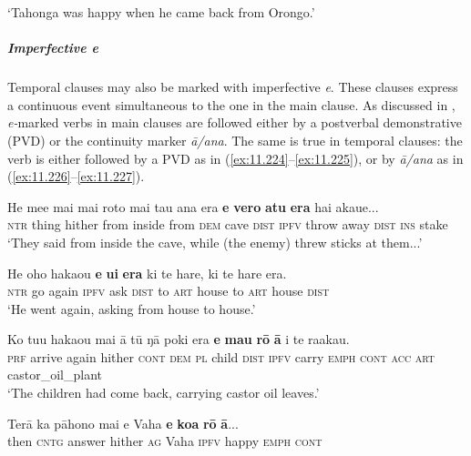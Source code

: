 \glt 
‘Tahonga was happy when he came back from Orongo.’ \textstyleExampleref{[R301.316]} 
\z

\subparagraph{Imperfective \textit{e}} Temporal clauses may also be marked with imperfective \textit{e}. These clauses express a continuous event simultaneous to the one in the main clause. As discussed in , \textit{e-}marked verbs in main clauses are followed either by a postverbal demonstrative (PVD) or the continuity marker \textit{{\ꞌ}ā/{\ꞌ}ana}. The same is true in temporal clauses: the verb is either followed by a PVD as in (\ref{ex:11.224}–\ref{ex:11.225}), or by \textit{{\ꞌ}ā/{\ꞌ}ana} as in (\ref{ex:11.226}–\ref{ex:11.227}).

\ea\label{ex:11.224}
\gll He me{\ꞌ}e mai mai roto mai tau {\ꞌ}ana era \textbf{e} \textbf{vero} \textbf{atu} \textbf{era} hai akaue... \\
\textsc{ntr} thing hither from inside from \textsc{dem} cave \textsc{dist} \textsc{ipfv} throw away \textsc{dist} \textsc{ins} stake \\

\glt 
‘They said from inside the cave, while (the enemy) threw sticks at them...’ \textstyleExampleref{[Mtx-3-02.042]}
\z

\ea\label{ex:11.225}
\gll He oho haka{\ꞌ}ou \textbf{e} \textbf{{\ꞌ}ui} \textbf{era} ki te hare, ki te hare era. \\
\textsc{ntr} go again \textsc{ipfv} ask \textsc{dist} to \textsc{art} house to \textsc{art} house \textsc{dist} \\

\glt 
‘He went again, asking from house to house.’ \textstyleExampleref{[R310.152]} 
\z

\ea\label{ex:11.226}
\gll Ko tu{\ꞌ}u haka{\ꞌ}ou mai {\ꞌ}ā tū ŋā poki era \textbf{e} \textbf{ma{\ꞌ}u} \textbf{rō} \textbf{{\ꞌ}ā}  i te ra{\ꞌ}akau.\\
\textsc{prf} arrive again hither \textsc{cont} \textsc{dem} \textsc{pl} child \textsc{dist} \textsc{ipfv} carry \textsc{emph} \textsc{cont}  \textsc{acc} \textsc{art} castor\_oil\_plant\\

\glt 
‘The children had come back, carrying castor oil leaves.’ \textstyleExampleref{[R313.053]} 
\z

\ea\label{ex:11.227}
\gll Terā ka pāhono mai e Vaha \textbf{e} \textbf{koa} \textbf{rō} \textbf{{\ꞌ}ā}... \\
then \textsc{cntg} answer hither \textsc{ag} Vaha \textsc{ipfv} happy \textsc{emph} \textsc{cont} \\

